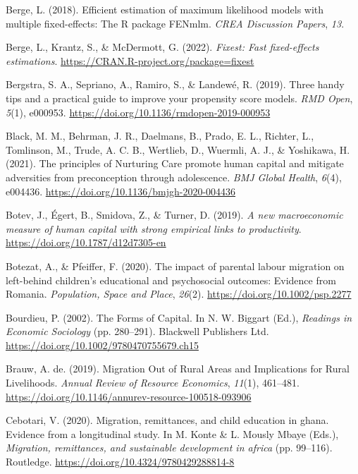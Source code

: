 \documentclass[
  man,floatsintext]{apa7}
\newlength{\cslhangindent}
\newlength{\cslentryspacingunit} %
\newenvironment{CSLReferences}[2] %
 {%
  \setlength{\parindent}{0pt}
  \ifodd #1
  \let\oldpar\par
  \def\par{\hangindent=\cslhangindent\oldpar}
  \fi
  \setlength{\parskip}{#2\cslentryspacingunit}
 }%
 {}
\begin{document}
\begin{CSLReferences}{1}{0}
\leavevmode{}%
Berge, L. (2018). Efficient estimation of maximum likelihood models with multiple fixed-effects: The {R} package {FENmlm}. \emph{CREA Discussion Papers}, \emph{13}.

\leavevmode{}%
Berge, L., Krantz, S., \& McDermott, G. (2022). \emph{Fixest: Fast fixed-effects estimations}. \url{https://CRAN.R-project.org/package=fixest}

\leavevmode{}%
Bergstra, S. A., Sepriano, A., Ramiro, S., \& Landewé, R. (2019). Three handy tips and a practical guide to improve your propensity score models. \emph{RMD Open}, \emph{5}(1), e000953. \url{https://doi.org/10.1136/rmdopen-2019-000953}

\leavevmode{}%
Black, M. M., Behrman, J. R., Daelmans, B., Prado, E. L., Richter, L., Tomlinson, M., Trude, A. C. B., Wertlieb, D., Wuermli, A. J., \& Yoshikawa, H. (2021). The principles of Nurturing Care promote human capital and mitigate adversities from preconception through adolescence. \emph{BMJ Global Health}, \emph{6}(4), e004436. \url{https://doi.org/10.1136/bmjgh-2020-004436}

\leavevmode{}%
Botev, J., Égert, B., Smidova, Z., \& Turner, D. (2019). \emph{A new macroeconomic measure of human capital with strong empirical links to productivity}. \url{https://doi.org/10.1787/d12d7305-en}

\leavevmode{}%
Botezat, A., \& Pfeiffer, F. (2020). The impact of parental labour migration on left{-}behind children's educational and psychosocial outcomes: Evidence from Romania. \emph{Population, Space and Place}, \emph{26}(2). \url{https://doi.org/10.1002/psp.2277}

\leavevmode{}%
Bourdieu, P. (2002). The Forms of Capital. In N. W. Biggart (Ed.), \emph{Readings in Economic Sociology} (pp. 280--291). Blackwell Publishers Ltd. \url{https://doi.org/10.1002/9780470755679.ch15}

\leavevmode{}%
Brauw, A. de. (2019). Migration Out of Rural Areas and Implications for Rural Livelihoods. \emph{Annual Review of Resource Economics}, \emph{11}(1), 461--481. \url{https://doi.org/10.1146/annurev-resource-100518-093906}

\leavevmode{}%
Cebotari, V. (2020). Migration, remittances, and child education in ghana. Evidence from a longitudinal study. In M. Konte \& L. Mously Mbaye (Eds.), \emph{Migration, remittances, and sustainable development in africa} (pp. 99--116). Routledge. \url{https://doi.org/10.4324/9780429288814-8}


\end{CSLReferences}
\end{document}
